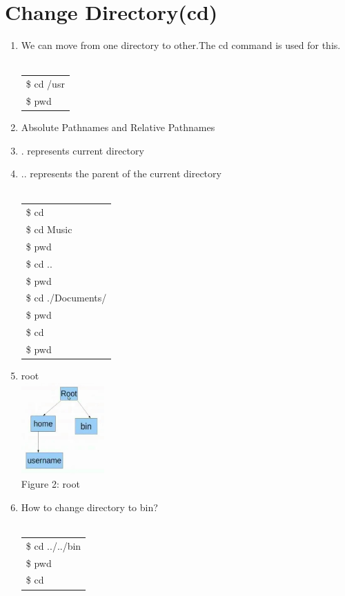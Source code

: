 \documentclass[12pt, a4paper]{report}
\begin{document}
\section{Change Directory(cd)}
\begin{enumerate}
\item We can move from one directory to other.The cd command is used for this.\\
\\
\begin{tabular}{|l|}\hline
\$ cd /usr\\
\$ pwd \\ \hline
\end{tabular}
\item Absolute Pathnames and Relative Pathnames
\item . represents current directory
\item .. represents the parent of the current directory\\
\\
\begin{tabular}{|l|}\hline
\$ cd\\
\$ cd Music\\
\$ pwd\\
\$ cd ..\\
\$ pwd\\
\$ cd ./Documents/\\
\$ pwd\\
\$ cd\\
\$ pwd\\ \hline
\end{tabular}
\item root\\
\includegraphics[width=0.25\textwidth]{07_fs.jpg}\\
Figure 2: root
\item How to change directory to bin?\\
\\
\begin{tabular}{|l|}\hline
\$ cd ../../bin\\
\$ pwd\\
\$ cd\\ \hline
\end{tabular}
\end{enumerate}
\end{document}
